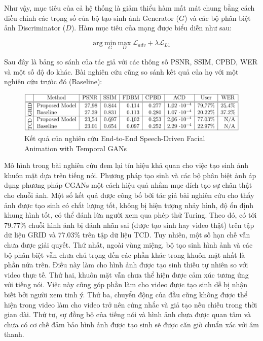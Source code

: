 Như vậy, mục tiêu của cả hệ thống là giảm thiểu hàm mất mát chung bằng cách điều chỉnh các trọng số của bộ tạo sinh ảnh Generator ($G$) và các bộ phân biệt ảnh Discriminator ($D$). Hàm mục tiêu của mạng được biểu diễn như sau:

\begin{equation}
    \mathrm{arg}\: \underset{G}{\mathrm{min}}\: \underset{D}{\mathrm{max}}\: \mathcal{L}_{adv} + \lambda\mathcal{L}_{L1}
    \label{eqn:vou2019_loss}
\end{equation}

Sau đây là bảng so sánh của tác giả với các thông số PSNR, SSIM, CPBD, WER và một số độ đo khác. Bài nghiên cứu cũng so sánh kết quả của họ với một nghiên cứu trước đó (Baseline):

\begin{figure}[H]
    \centering
    \includegraphics[width=15cm]{./content/images/vou2019_result.png}
    \caption{Kết quả của nghiên cứu End-to-End Speech-Driven Facial Animation with Temporal GANs}
    \label{fig:vou2019_result}
\end{figure}

Mô hình trong bài nghiên cứu đem lại tín hiệu khả quan cho việc tạo sinh ảnh khuôn mặt dựa trên tiếng nói. Phương pháp tạo sinh và các bộ phân biệt ảnh áp dụng phương pháp CGANs một cách hiệu quả nhẳm mục đích tạo sự chân thật cho chuỗi ảnh. Một số kết quả được công bố bởi tác giả bài nghiên cứu cho thấy ảnh được tạo sinh có chất lượng tốt, không bị hiện tượng nhảy hình, độ ổn định khung hình tốt, có thể đánh lừa người xem qua phép thử Turing. Theo đó, có tới 79.77\% chuỗi hình ảnh bị đánh nhãn sai (được tạo sinh hay video thật) trên tập dữ liệu GRID và 77.03\% trên tập dữ liệu TCD. Tuy nhiên, một số hạn chế vẫn chưa được giải quyết. Thứ nhất, ngoài vùng miệng, bộ tạo sinh hình ảnh và các bộ phân biệt vẫn chưa chú trọng đến các phần khác trong khuôn mặt nhất là phần nửa trên. Điều này làm cho hình ảnh được tạo sinh thiếu tự nhiên so với video thực tế. Thứ hai, khuôn mặt vẫn chưa thể hiện được cảm xúc tương ứng với tiếng nói. Việc này cũng góp phần làm cho video được tạo sinh dễ bị nhận biết bởi người xem tinh ý. Thứ ba, chuyển động của đầu cũng không được thể hiện trong video làm cho video trở nên cứng nhắc và giả tạo nếu chiếu trong thời gian dài. Thứ tư, sự đồng bộ của tiếng nói và hình ảnh chưa được quan tâm và chưa có cơ chế đảm bảo hình ảnh được tạo sinh sẽ được căn giờ chuẩn xác với âm thanh.

